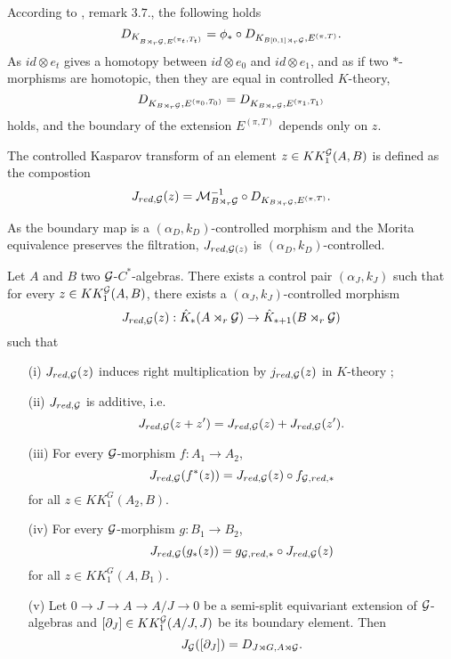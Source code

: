 According to \cite{OY2}, remark $3.7.$, the following holds
\[D_{K_{B\rtimes_r\mathcal G,E^{(\pi_t,T_t)}}} = \phi_* \circ D_{K_{B[0,1]\rtimes_r\mathcal G},E^{(\pi,T)}}.\]
As $id \otimes e_t$ gives a homotopy between $id\otimes e_0$ and $id\otimes e_1$, and as if two $*$-morphisms are homotopic, then they are equal in controlled $K$-theory, 
\[D_{K_{B\rtimes_r \mathcal G}, E^{(\pi_0,T_0)}}=D_{K_{B\rtimes_r \mathcal G}, E^{(\pi_1,T_1)}}\]
holds, and the boundary of the extension $E^{(\pi,T)}$ depends only on $z$.\\

\begin{definition}
The controlled Kasparov transform of an element $z\in KK_1^\mathcal G(A,B)$ is defined as the compostion
\[J_{red,\mathcal G}(z)=\mathcal M_{B\rtimes_r \mathcal G}^{-1}\circ D_{K_{B\rtimes_r \mathcal G}, E^{(\pi,T)}}.\]
\end{definition}

As the boundary map is a $(\alpha_D,k_D)$-controlled morphism and the Morita equivalence preserves the filtration, $J_{red,\mathcal G(z)}$ is  $(\alpha_D,k_D)$-controlled. 

\begin{prop}\label{Kasparov1}
Let $A$ and $B$ two $\mathcal G$-$C^*$-algebras. There exists a control pair $(\alpha_J,k_J)$ such that for every $z\in KK^\mathcal G_1(A,B)$, there exists a $(\alpha_J,k_J)$-controlled morphism
\[J_{red,\mathcal G}(z) : \hat K_*(A\rtimes_r \mathcal G)\rightarrow \hat K_{*+1}(B\rtimes_r \mathcal G)\]
such that
\begin{enumerate}
\item[(i)] $J_{red,\mathcal G}(z)$ induces right multiplication by $j_{red,\mathcal G}(z)$ in $K$-theory ;
\item[(ii)] $J_{red,\mathcal G}$ is additive, i.e.
\[J_{red,\mathcal G}(z+z')=J_{red,\mathcal G}(z)+J_{red,\mathcal G}(z').\]
\item[(iii)] For every $\mathcal G$-morphism $f : A_1\rightarrow A_2$,
\[J_{red,\mathcal G}(f^*(z))=J_{red,\mathcal G}(z)\circ f_{\mathcal G,red,*}\] for all $z\in KK_1^G(A_2,B)$.
\item[(iv)] For every $\mathcal G$-morphism $g : B_1\rightarrow B_2$,
\[J_{red,\mathcal G}(g_*(z))= g_{\mathcal G,red,*}\circ J_{red,\mathcal G}(z)\] for all $z\in KK_1^G(A,B_1)$.
\item[(v)] Let $0\rightarrow J\rightarrow A\rightarrow A/J\rightarrow 0$ be a semi-split equivariant extension of $\mathcal G$-algebras and $[\partial_J]\in KK_1^\mathcal G(A/J,J)$ be its boundary element. Then 
\[J_\mathcal G([\partial_J])=D_{J\rtimes G,A\rtimes\mathcal G}.\] 
\end{enumerate}
\end{prop}

